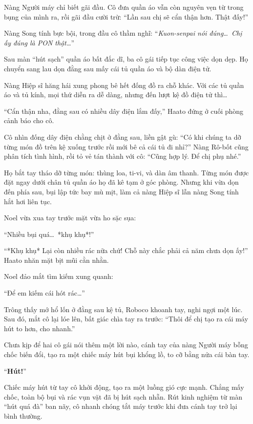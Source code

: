 \documentclass[../main.tex]{subfiles}
\begin{document}
Nàng Người máy chỉ biết gãi đầu. Cô đưa quần áo vẫn còn nguyên vẹn từ trong bụng của mình ra, rồi gãi đầu cười trừ: ``Lần sau chị sẽ cẩn thận hơn. Thật đấy!''

Nàng Song tính bực bội, trong đầu cô thầm nghĩ: ``\textit{Kuon-senpai nói đúng\dots\ Chị ấy đúng là PON thật\dots}''

\ct

Sau màn ``hút sạch'' quần áo bất đắc dĩ, ba cô gái tiếp tục công việc dọn dẹp. Họ chuyển sang lau dọn đằng sau mấy cái tủ quần áo và bộ dàn điện tử.

Nàng Hiệp sĩ hăng hái xung phong bê hết đống đồ ra chỗ khác. Với các tủ quần áo và tủ kính, mọi thứ diễn ra dễ dàng, nhưng đến lượt kệ đồ điện tử thì\dots

``Cẩn thận nha, đằng sau có nhiều dây điện lắm đấy,'' Haato đứng ở cuối phòng cảnh báo cho cô.

Cô nhìn đống dây điện chằng chịt ở đằng sau, liền gật gù: ``Có khi chúng ta dỡ từng món đồ trên kệ xuống trước rồi mới bê cả cái tủ đi nhỉ?'' Nàng Rô-bốt cũng phân tích tình hình, rồi tỏ vẻ tán thành với cô: ``Cũng hợp lý. Để chị phụ nhé.''

Họ bắt tay tháo dỡ từng món: thùng loa, ti-vi, và dàn âm thanh. Từng món được đặt ngay dưới chân tủ quần áo họ đã kê tạm ở góc phòng. Nhưng khi vừa dọn đến phía sau, bụi lập tức bay mù mịt, làm cả nàng Hiệp sĩ lẫn nàng Song tính hắt hơi liên tục.

Noel vừa xua tay trước mặt vừa ho sặc sụa:

``Nhiều bụi quá\dots\ *khụ khụ*!''

``*Khụ khụ* Lại còn nhiều rác nữa chứ! Chỗ này chắc phải cả năm chưa dọn ấy!'' Haato nhăn mặt bịt mũi cằn nhằn.

Noel đảo mắt tìm kiếm xung quanh:

``Để em kiếm cái hót rác\dots''

Trông thấy mớ hổ lốn ở đằng sau kệ tủ, Roboco khoanh tay, nghi ngợi một lúc. Sau đó, mắt cô lại lóe lên, bất giác chìa tay ra trước: ``Thôi để chị tạo ra cái máy hút to hơn, cho nhanh.''

Chưa kịp để hai cô gái nói thêm một lời nào, cánh tay của nàng Người máy bỗng chốc biến đổi, tạo ra một chiếc máy hút bụi khổng lồ, to cỡ bằng nửa cái bàn tay.

``\textbf{Hút!}''

Chiếc máy hút từ tay cô khởi động, tạo ra một luồng gió cực mạnh. Chẳng mấy chốc, toàn bộ bụi và rác vụn vặt đã bị hút sạch nhẵn. Rút kinh nghiệm từ màn ``hút quá đà'' ban nãy, cô nhanh chóng tắt máy trước khi đưa cánh tay trở lại bình thường.
\end{document}
